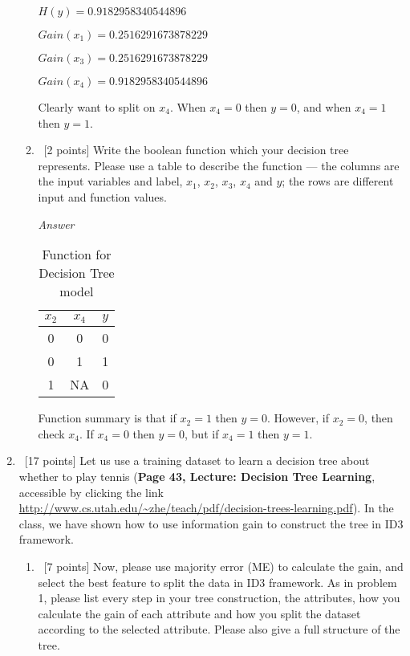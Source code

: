 \documentclass[12pt, fullpage,letterpaper]{article}
\begin{document}
\begin{enumerate}
\begin{enumerate}
$H(y)=0.9182958340544896$

$Gain(x_1)=0.2516291673878229$

$Gain(x_3)=0.2516291673878229$

$Gain(x_4)=0.9182958340544896$

Clearly want to split on $x_4$. When $x_4=0$ then $y=0$, and when $x_4=1$ then $y=1$.

\item~[2 points] Write the boolean function which your decision tree represents. Please use a table to describe the function --- the columns are the input variables and label, \ie $x_1$, $x_2$, $x_3$, $x_4$ and $y$; the rows are different input and  function values. 

\emph{Answer}

\begin{table}[h]
	\centering
	\begin{tabular}{cc|c}
		$x_2$ & $x_4$ & $y$\\ 
		\hline\hline
		0 & 0 & 0 \\ \hline
		0 & 1 & 1 \\ \hline
		1 & NA & 0 \\ \hline
	\end{tabular}
	\caption{Function for Decision Tree model}
\end{table}

Function summary is that if $x_2=1$ then $y=0$. However, if $x_2=0$, then check $x_4$. If $x_4=0$ then $y=0$, but if $x_4=1$ then $y=1$.

\end{enumerate}

\item~[17 points] Let us use a training dataset to learn a decision tree about whether to play tennis (\textbf{Page 43, Lecture: Decision Tree Learning}, accessible by clicking the link \href{http://www.cs.utah.edu/~zhe/teach/pdf/decision-trees-learning.pdf}{http://www.cs.utah.edu/\textasciitilde zhe/teach/pdf/decision-trees-learning.pdf}). In the class, we have shown how to use information gain to construct the tree in ID3 framework.  

\begin{enumerate}
	\item~[7 points] Now, please use majority error (ME) to calculate the gain, and select the best feature to split the data in ID3 framework. As in problem 1, please list every step in your tree construction,  the attributes,  how you calculate the gain of each attribute and how you split the dataset according to the selected attribute. Please also give a full structure of the tree.
	

\end{enumerate}
\end{enumerate}
\end{document}

